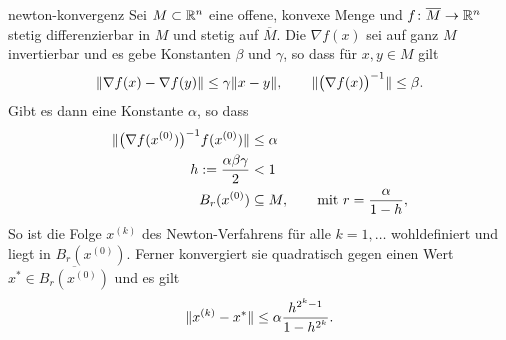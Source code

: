 \begin{Satz}{newton-konvergenz}
  Sei $M\subset \mathbb R^n$ eine offene, konvexe Menge und
  $f\colon \overline{M} \to \mathbb R^n$ stetig differenzierbar in $M$ und
  stetig auf $\overline{M}$. Die  $\nabla f(x)$
  sei auf ganz $M$ invertierbar und es gebe Konstanten $\beta$ und
  $\gamma$, so dass für $x,y\in M$ gilt
  \begin{gather}
    \label{eq:newton:2}
    \lVert\nabla f(x) - \nabla f(y)\rVert \le \gamma \lVert x-y\rVert,
    \qquad \lVert\bigl(\nabla f(x)\bigr)^{-1}\rVert \le \beta.
  \end{gather}
  Gibt es dann eine Konstante $\alpha$, so dass
  \begin{align}
    \label{eq:newton:3}
    \lVert\bigl(\nabla f(x^{(0)})\bigr)^{-1} f(x^{(0)})\rVert
    &\le \alpha\\
    h := \frac{\alpha\beta\gamma}2 &<1\\
    B_r(x^{(0)}) &\subseteq M, \qquad\text{mit } r=\frac{\alpha}{1-h},
  \end{align}
  So ist die Folge $x^{(k)}$ des Newton-Verfahrens für alle
  $k=1,\dots$ wohldefiniert und liegt in $B_r(x^{(0)})$. Ferner
  konvergiert sie quadratisch gegen einen Wert
  $x^*\in\overline{B_r(x^{(0)})}$ und es gilt
  \begin{gather}
    \label{eq:newton:4}
    \lVert x^{(k)}-x^*\rVert \le \alpha\frac{h^{2^k-1}}{1-h^{2^k}}.
  \end{gather}
\end{Satz}

